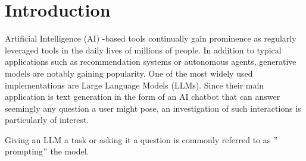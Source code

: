 
\chapter{Introduction}
\label{ch:introduction}
Artificial Intelligence (AI) -based tools continually gain prominence as regularly leveraged tools
in the daily lives of millions of people.
In addition to typical applications such as recommendation systems or autonomous agents,
generative models are notably gaining popularity.
One of the most widely used implementations are Large Language Models (LLMs).
Since their main application is text generation in the form of an AI chatbot that can answer seemingly
any question a user might pose, an investigation of such interactions is particularly of interest.

%
%
%
Giving an LLM a task or asking it a question is commonly referred to as \("\)prompting\("\) the model.

%
%

